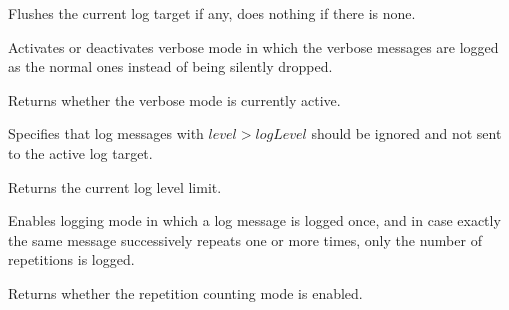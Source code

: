 \label{wxlogflushactive}


Flushes the current log target if any, does nothing if there is none.



\label{wxlogsetverbose}


Activates or deactivates verbose mode in which the verbose messages are
logged as the normal ones instead of being silently dropped.

\label{wxloggetverbose}


Returns whether the verbose mode is currently active.

\label{wxlogsetloglevel}


Specifies that log messages with $level > logLevel$ should be ignored
and not sent to the active log target.

\label{wxloggetloglevel}


Returns the current log level limit.

\label{wxlogsetrepetitioncounting}


Enables logging mode in which a log message is logged once, and in case exactly
the same message successively repeats one or more times, only the number of 
repetitions is logged.

\label{wxloggetrepetitioncounting}


Returns whether the repetition counting mode is enabled.


\label{wxlogsettimestamp}


